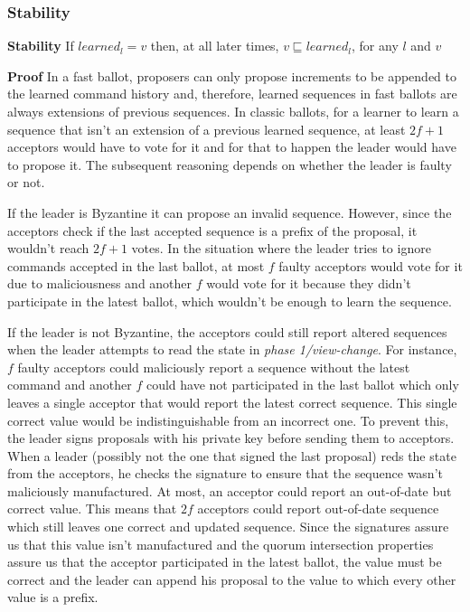 \subsubsection{Stability}
\textbf{Stability} If $learned_l = v$ then, at all later times, $v \sqsubseteq learned_l$, for any $l$ and $v$\par
\textbf{Proof} In a fast ballot, proposers can only propose increments to be appended to the learned command history and, therefore, learned sequences in fast ballots are always extensions of previous sequences. In classic ballots, for a learner to learn a sequence that isn't an extension of a previous learned sequence, at least $2f+1$ acceptors would have to vote for it and for that to happen the leader would have to propose it. The subsequent reasoning depends on whether the leader is faulty or not.\par
If the leader is Byzantine it can propose an invalid sequence. However, since the acceptors check if the last accepted sequence is a prefix of the proposal, it wouldn't reach $2f+1$ votes. In the situation where the leader tries to ignore commands accepted in the last ballot, at most $f$ faulty acceptors would vote for it due to maliciousness and another $f$ would vote for it because they didn't participate in the latest ballot, which wouldn't be enough to learn the sequence. \par
If the leader is not Byzantine, the acceptors could still report altered sequences when the leader attempts to read the state in \textit{phase 1/view-change}. For instance, $f$ faulty acceptors could maliciously report a sequence without the latest command and another $f$ could have not participated in the last ballot which only leaves a single acceptor that would report the latest correct sequence. This single correct value would be indistinguishable from an incorrect one. To prevent this, the leader signs proposals with his private key before sending them to acceptors. When a leader (possibly not the one that signed the last proposal) reds the state from the acceptors, he checks the signature to ensure that the sequence wasn't maliciously manufactured. At most, an acceptor could report an out-of-date but correct value. This means that $2f$ acceptors could report out-of-date sequence which still leaves one correct and updated sequence. Since the signatures assure us that this value isn't manufactured and the quorum intersection properties assure us that the acceptor participated in the latest ballot, the value must be correct and the leader can append his proposal to the value to which every other value is a prefix.